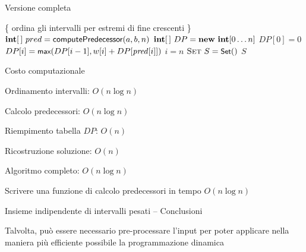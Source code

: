 \begin{frame}[shrink=10]{Versione completa}

\vspace{-6pt}
\begin{Procedure}
\caption[A]{\Set\ \maxinterval($\INTARRAY\ a,\ \INTARRAY\ b,\ \INTARRAY w$, \INTEGER $n$)}	

\{ ordina gli intervalli per estremi di fine crescenti \}\;
$\INTARRAY\ pred = \textsf{computePredecessor}(a,b,n)$\;
$\INTARRAY\ DP = \NEW\ \INTEGER[0 \mldots n]$\;
$DP[0] = 0$\;
{
  $DP[i] = \textsf{{\small max}}(DP[i-1], w[i] + DP[\mathit{pred}[i]])$\;
}
$i = n$\;
$\textsc{Set}\ S = \textsf{{\small Set}}()$\;
{
}
\Return $S$\;
\end{Procedure}

\end{frame}

\begin{frame}{Costo computazionale}

\vspace{-6pt}
\BIL
\item Ordinamento intervalli: \alert{$O(n \log n)$}
\item Calcolo predecessori: \alert{$O(n \log n)$}
\item Riempimento tabella $DP$: \alert{$O(n)$}
\item Ricostruzione soluzione: \alert{$O(n)$}
\item Algoritmo completo: \alert{$O(n \log n)$}
\EIL

Scrivere una funzione di calcolo predecessori in tempo $O(n \log n)$

\end{frame}

\begin{frame}{Insieme indipendente di intervalli pesati -- Conclusioni}

\vspace{-6pt}
\begin{myboxtitle}
Talvolta, può essere necessario pre-processare l'input per poter applicare nella maniera più efficiente possibile la programmazione dinamica
\end{myboxtitle}

\end{frame}

